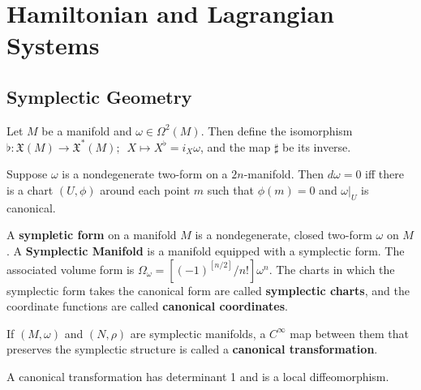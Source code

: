 \documentclass{article}
\begin{document}
\section{Hamiltonian and Lagrangian Systems}

\subsection{Symplectic Geometry}

\begin{defn}

Let $M$ be a manifold and $\omega \in \Omega^2(M) $. Then define the isomorphism $ \flat: \mathfrak{X}(M) \to \mathfrak{X}^* (M); \hspace{6pt} X \mapsto X^{\flat} = i_X \omega$, and the map $\sharp$ be its inverse.

\end{defn}
\begin{thm}[Darboux]
Suppose $\omega$ is a nondegenerate two-form on a $2n$-manifold. Then $d\omega = 0$ iff there is a chart $(U, \phi)$ around each point $m$ such that $\phi(m) = 0$ and $\omega\vert_U$ is canonical.
\end{thm}

\begin{defn}
A \textbf{sympletic form} on a manifold $M$ is a nondegenerate, closed two-form $\omega$ on $M$. A \textbf{Symplectic Manifold} is a manifold equipped with a symplectic form. The associated volume form is $\Omega_{\omega} = [(-1)^{[n/2]}/n!]\omega^n$. The charts in which the symplectic form takes the canonical form are called \textbf{symplectic charts}, and the coordinate functions are called \textbf{canonical coordinates}.
\end{defn}

\begin{defn}

If $(M,\omega)$ and $(N, \rho)$ are symplectic manifolds, a $C^{\infty}$ map between them that preserves the symplectic structure is called a \textbf{canonical transformation}.

\end{defn}

\begin{prop}

A canonical transformation has determinant 1 and is a local diffeomorphism.

\end{prop}
\end{document}
